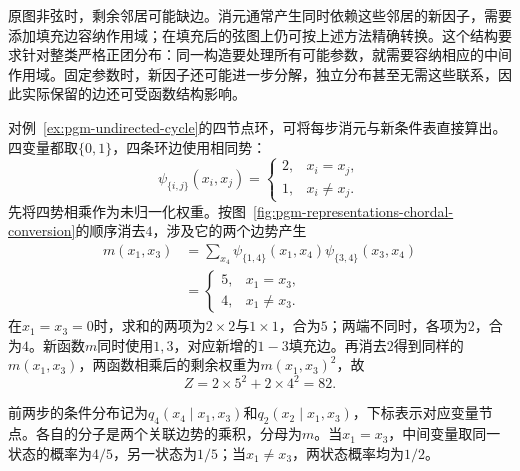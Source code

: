 原图非弦时，剩余邻居可能缺边。消元通常产生同时依赖这些邻居的新因子，需要添加填充边容纳作用域；在填充后的弦图上仍可按上述方法精确转换。这个结构要求针对整类严格正团分布：同一构造要处理所有可能参数，就需要容纳相应的中间作用域。固定参数时，新因子还可能进一步分解，独立分布甚至无需这些联系，因此实际保留的边还可受函数结构影响。

对例~\ref{ex:pgm-undirected-cycle}的四节点环，可将每步消元与新条件表直接算出。四变量都取$\{0,1\}$，四条环边使用相同势：
\begin{equation}
  \psi_{\{i,j\}}(x_i,x_j)=
  \begin{cases}
    2,&x_i=x_j,\\
    1,&x_i\ne x_j.
  \end{cases}
  \label{eq:pgm-representations-cycle-potentials}
\end{equation}
先将四势相乘作为未归一化权重。按图~\ref{fig:pgm-representations-chordal-conversion}的顺序消去$4$，涉及它的两个边势产生
\begin{equation}
  \begin{aligned}
    m(x_1,x_3)
    &=\sum_{x_4}\psi_{\{1,4\}}(x_1,x_4)
    \psi_{\{3,4\}}(x_3,x_4)\\
    &=
    \begin{cases}
      5,&x_1=x_3,\\
      4,&x_1\ne x_3.
    \end{cases}
  \end{aligned}
  \label{eq:pgm-representations-cycle-message}
\end{equation}
在$x_1=x_3=0$时，求和的两项为$2\times2$与$1\times1$，合为$5$；两端不同时，各项为$2$，合为$4$。新函数$m$同时使用$1,3$，对应新增的$1-3$填充边。再消去$2$得到同样的$m(x_1,x_3)$，两函数相乘后的剩余权重为$m(x_1,x_3)^2$，故
\[
  Z=2\times5^2+2\times4^2=82.
\]

前两步的条件分布记为$q_4(x_4\mid x_1,x_3)$和$q_2(x_2\mid x_1,x_3)$，下标表示对应变量节点。各自的分子是两个关联边势的乘积，分母为$m$。当$x_1=x_3$，中间变量取同一状态的概率为$4/5$，另一状态为$1/5$；当$x_1\ne x_3$，两状态概率均为$1/2$。


